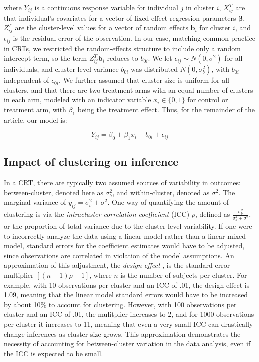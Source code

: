 \documentclass[twocolumn]{bmcart}%
\begin{document}
where $Y_{ij}$ is a continuous response variable for individual $j$ in cluster $i$, $X_{ij}^T$ are that individual's covariates for a vector of fixed effect regression parameters $\boldsymbol{\beta}$, $Z_{ij}^T$ are the cluster-level values for a vector of random effects $\boldsymbol{b}_i$ for cluster $i$, and $\epsilon_{ij}$ is the residual error of the observation. In our case, matching common practice in CRTs, we restricted the random-effects structure to include only a random intercept term, so the term $Z_{ij}^T \boldsymbol{b}_i$ reduces to $b_{0i}$. We let $\epsilon_{ij} \sim N(0, \sigma^2)$ for all individuals, and cluster-level variance $b_{0i}$ was distributed $N(0, \sigma_b^2)$, with $b_{0i}$ independent of $\epsilon _{0i}$. We further assumed that cluster size is uniform for all clusters, and that there are two treatment arms with an equal number of clusters in each arm, modeled with an indicator variable $x_{i}\in \{0,1\}$ for control or treatment arm, with $\beta_1$ being the treatment effect. Thus, for the remainder of the article, our model is:

\begin{equation}
  \label{eq:2}
  Y_{ij} = \beta_0 + \beta_1 x_{i} + b_{0i} + \epsilon_{ij}
\end{equation}


\subsection*{Impact of clustering on inference}

In a CRT, there are typically two assumed sources of variability in outcomes: between-cluster, denoted here as $\sigma^2_b$, and within-cluster, denoted as $\sigma^2$. The marginal variance of $y_{ij} = \sigma_b^2 + \sigma^2$. One way of quantifying the amount of clustering is via the \textit{intracluster correlation coefficient} (ICC) $\rho$, defined as $\frac{\sigma^2_b}{\sigma^2_b + \sigma^2}$, or the proportion of total variance due to the cluster-level variability. If one were to incorrectly analyze the data using a linear model rather than a linear mixed model, standard errors for the coefficient estimates would have to be adjusted, since observations are correlated 
in violation of the model assumptions. An approximation of this adjustment, the \textit{design effect} \cite{kish_survey_1965}, is the standard error multiplier $[(n-1)\rho + 1]$, where $n$ is the number of subjects per cluster. For example, with 10 observations per cluster and an ICC of .01, the design effect is 1.09, meaning that the linear model standard errors would have to be increased by about 10\% to account for clustering. However, with 100 observations per cluster and an ICC of .01, the mulitplier increases to 2, and for 1000 observations per cluster it increases to 11, meaning that even a very small ICC can drastically change inferences as cluster size grows. This approximation demonstrates the necessity of accounting for between-cluster variation in the data analysis, even if the ICC is expected to be small.
\end{document}
